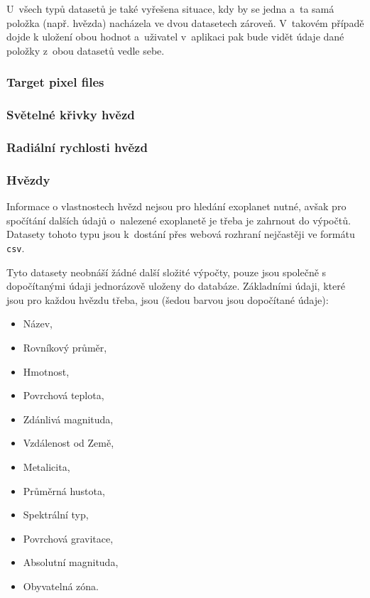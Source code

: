 \documentclass[a4paper,12pt]{article}
\def\code#1{\texttt{#1}}
\begin{document}
{{U~všech typů datasetů je také vyřešena situace, kdy by se jedna a~ta samá položka (např. hvězda) nacházela ve dvou datasetech zároveň. V~takovém případě dojde k uložení obou hodnot a~uživatel v~aplikaci pak bude vidět údaje dané položky z~obou datasetů vedle sebe.

\subsubsection{Target pixel files}

\subsubsection{Světelné křivky hvězd}

\subsubsection{Radiální rychlosti hvězd}

\subsubsection{Hvězdy}

Informace o vlastnostech hvězd nejsou pro hledání exoplanet nutné, avšak pro spočítání dalších údajů o~nalezené exoplanetě je třeba je zahrnout do výpočtů. Datasety tohoto typu jsou k~dostání přes webová rozhraní nejčastěji ve formátu \code{csv}.


Tyto datasety neobnáší žádné další složité výpočty, pouze jsou společně s dopočítanými údaji jednorázově uloženy do databáze. Základními údaji, které jsou pro každou hvězdu třeba, jsou (šedou barvou jsou dopočítané údaje):


\begin{multicols}{3}
\begin{itemize}
\item Název,
\item Rovníkový průměr,
\item Hmotnost,
\item Povrchová teplota,
\item Zdánlivá magnituda,
\item Vzdálenost od Země,
\item Metalicita,
\color{gray}
\item Průměrná hustota,
\item Spektrální typ,
\item Povrchová gravitace,
\item Absolutní magnituda,
\item Obyvatelná zóna.
\end{itemize}
\end{multicols}

}}
\end{document}

